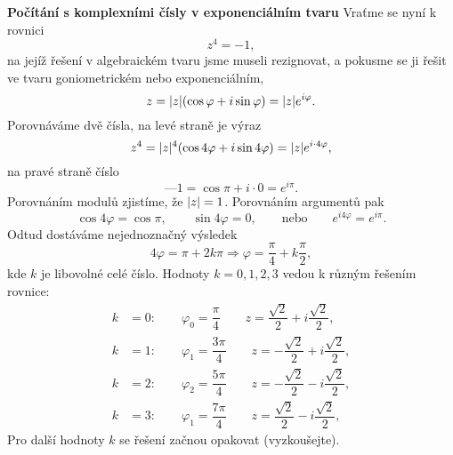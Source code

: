 \wikitextrule
\begin{example}\label{mai:exam080}
  \textbf{Počítání s komplexními čísly v exponenciálním tvaru}\newline\small
    Vraťme se nyní k rovnici
    \begin{equation*}
      z^4 = -1,
    \end{equation*}
    na jejíž řešení v algebraickém tvaru jsme museli rezignovat, a pokusme se ji řešit ve tvaru 
    goniometrickém nebo exponenciálním, 
    \begin{equation*}
      z = \lvert z\rvert(\cos\varphi + i\sin\varphi) = \lvert z\rvert e^{i\varphi}.
    \end{equation*}
    Porovnáváme dvě čísla, na levé straně je výraz
    \begin{equation*}
      z^4 = \lvert z\rvert^4(\cos4\varphi + i\sin4\varphi) = \lvert z\rvert e^{i\cdot4\varphi},
    \end{equation*}
    na pravé straně číslo
    \begin{equation*}
      —1 = \cos\pi + i\cdot0 = e^{i\pi}. 
    \end{equation*}
    Porovnáním modulů zjistíme, že \(\lvert z\rvert = 1\). Porovnáním argumentů pak
    \begin{equation*}
      \cos4\varphi = \cos\pi, \qquad \sin4\varphi = 0, \qquad \text{nebo} \qquad
      e^{i4\varphi}= e^{i\pi}.
    \end{equation*}
    Odtud dostáváme nejednoznačný výsledek
    \begin{equation*}
      4\varphi = \pi + 2k\pi \Rightarrow \varphi = \dfrac{\pi}{4} + k\dfrac{\pi}{2},
    \end{equation*}
    kde \(k\) je libovolné celé číslo. Hodnoty \(k = 0, 1, 2, 3\) vedou k různým řešením rovnice:
    \begin{align*}
      k &= 0:\qquad\varphi_0 =\dfrac{ \pi}{4}\qquad z= \dfrac{\sqrt{2}}{2}+i\dfrac{\sqrt{2}}{2},  \\
      k &= 1:\qquad\varphi_1 =\dfrac{3\pi}{4}\qquad z=-\dfrac{\sqrt{2}}{2}+i\dfrac{\sqrt{2}}{2},  \\
      k &= 2:\qquad\varphi_2 =\dfrac{5\pi}{4}\qquad z=-\dfrac{\sqrt{2}}{2}-i\dfrac{\sqrt{2}}{2},  \\
      k &= 3:\qquad\varphi_1 =\dfrac{7\pi}{4}\qquad z= \dfrac{\sqrt{2}}{2}-i\dfrac{\sqrt{2}}{2},
    \end{align*} 
    Pro další hodnoty \(k\) se řešení začnou opakovat (vyzkoušejte).
  \normalsize
\end{example}